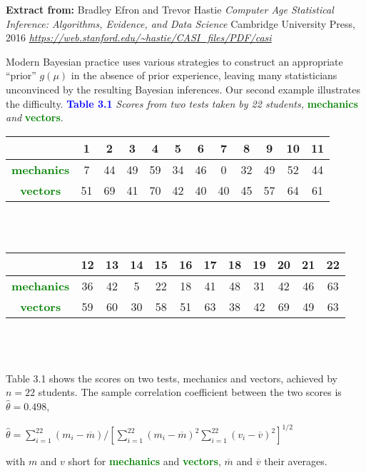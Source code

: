 \documentclass{article}
\begin{document}
\noindent
\large{\textbf{Extract from:}} 
\newline
Bradley Efron and Trevor Hastie
\newline
\textit{Computer Age Statistical Inference: Algorithms, Evidence, and Data Science}
\newline
Cambridge University Press, 2016
\newline
\textit{\url{https://web.stanford.edu/~hastie/CASI\_files/PDF/casi}}
\newline
\newline
\newline


Modern Bayesian practice uses various strategies to construct an
appropriate “prior” $g(\mu)$ in the absence of prior experience, leaving
many statisticians unconvinced by the resulting Bayesian inferences.
Our second example illustrates the difficulty.
\newline
\newline
\noindent
\textcolor{blue}{\textbf{Table 3.1}} \textit{Scores from two tests taken by 22 students,} \textcolor{green}{\textbf{mechanics}}
\textit{and} \textcolor{green}{\textbf{vectors}}.
\newline

\begin{tabular}{cccccccccccc}

     & 1 & 2 & 3 & 4 & 5 & 6 & 7 & 8 & 9 & 10 & 11 \\
     \midrule
     \textcolor{green}{\textbf{mechanics}} & 7 & 44 & 49 & 59 & 34 & 46 & 0 & 32 & 49 & 52 & 44 \\
     \textcolor{green}{\textbf{vectors}} & 51 & 69 & 41 & 70 & 42 & 40 & 40 & 45 & 57 & 64 & 61 \\
     \bottomrule
\end{tabular}
\\
\\

\begin{tabular}{cccccccccccc}
     & 12 & 13 & 14 & 15 & 16 & 17 & 18 & 19 & 20 & 21 & 22 \\
     \midrule
     \textcolor{green}{\textbf{mechanics}} & 36 & 42 & 5 & 22 & 18 & 41 & 48 & 31 & 42 & 46 & 63 \\
     \textcolor{green}{\textbf{vectors}} & 59 & 60 & 30 & 58 & 51 & 63 & 38 & 42 & 69 & 49 & 63 \\
     \bottomrule
\end{tabular}\\
\\
\\

Table 3.1 shows the scores on two tests, mechanics and vectors,
achieved by $n=22$ students. The sample correlation coefficient between
the two scores is $\hat{\theta}=0.498$,
\begin{center}
  $\hat{\theta}=\sum\limits^{22}_{i=1}(m_i-\overline{m})/[\sum\limits^{22}_{i=1}(m_i-\overline{m})^2\sum\limits^{22}_{i=1}(v_i-\overline{v})^2]^{1/2}$  
\end{center}
with $m$ and $v$ short for \textcolor{green}{\textbf{mechanics}} and \textcolor{green}{\textbf{vectors}}, $\overline{m}$ and $\overline{v}$  their averages.
\end{document}
